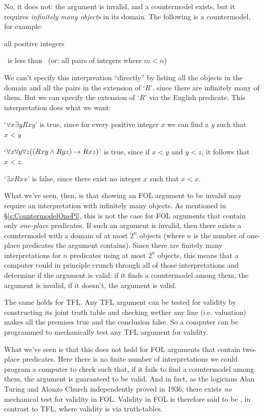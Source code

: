 No, it does not: the argument is invalid, and a countermodel exists, but it requires \emph{infinitely many objects} in its domain.  The following is a countermodel, for example:
\begin{ekey}
	\item[\text{Domain}] all positive integers
	\item[R] \blank \ is less than \blank \ (or: all pairs of integers  where $m < n$)
\end{ekey}
We can't specify this interpreation ``directly'' by listing all the objects in the domain and all the pairs in the extension of `$R$', since there are infinitely many of them.  But we can specify the extension of `$R$' via the English predicate. This interpretation does what we want:
\begin{ebullet}
\item `$\forall x\exists yRxy$' is true, since for every positive integer $x$ we can find a $y$ such that $x<y$
\item `$\forall x \forall y \forall z((Rxy \wedge Ryz) \rightarrow Rxz)$' is true, since if $x < y$ and $y < z$, it follows that $x < z$.
\item `$\exists xRxx$' is false, since there exist no integer $x$ such that $x < x$.
\end{ebullet}

What we've seen, then, is that showing an FOL argument to be invalid may require an interpretation with infinitely many objects.  As mentioned in \S\ref{s:CountermodelOnePl}, this is not the case for FOL arguments that contain only \emph{one-place} predicates.  If such an argument is invalid, then there exists a countermodel with a domain of at most $2^n$ objects (where $n$ is the number of one-place predicates the argument contains).  Since there are finitely many interpretations for $n$ predicates using at most $2^n$ objects, this means that a computer could in principle crunch through all of those interpretations and determine if the argument is valid: if it finds a countermodel among them, the argument is invalid, if it doesn't, the argument is valid.

The same holds for TFL.  Any TFL argument can be tested for validity by constructing its joint truth table and checking wether any line (i.e. valuation) makes all the premises true and the conclusion false.  So a computer can be programmed to mechanically test any TFL argument for validity.

What we've seen is that this does not hold for FOL arguments that contain two-place predicates.  Here there is no finite number of interpretations we could program a computer to check such that, if it fails to find a countermodel among them, the argument is guaranteed to be valid.  And in fact, as the logicians Alan Turing and Alonzo Church independently proved in 1936, there exists \emph{no} mechanical test for validity in FOL. Validity in FOL is therefore said to be , in contrast to TFL, where validity is  via truth-tables.


